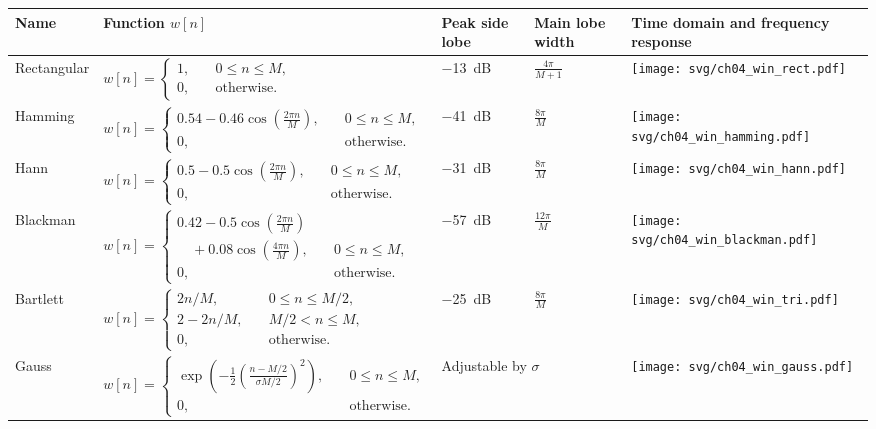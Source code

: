 \begin{refsection}
\begin{landscape}
	\begin{longtable}[H]{|l|l|l|l|l|}
		\hline
		Name & Function $w[n]$ & Peak side lobe & Main lobe width & Time domain and frequency response \\
		\hline
		\hline
		Rectangular & $w[n] = \begin{cases}1, &\quad 0 \leq n \leq M,\\ 0, &\quad \text{otherwise}.\end{cases}$ & \SI{-13}{dB} & $\frac{4\pi}{M+1}$ & \texttt{[image: svg/ch04\_win\_rect.pdf]} \\
		\hline
		Hamming & $w[n] = \begin{cases}0.54 - 0.46 \cos\left(\frac{2 \pi n}{M}\right), &\quad 0 \leq n \leq M,\\ 0, &\quad \text{otherwise}.\end{cases}$ & \SI{-41}{dB} & $\frac{8\pi}{M}$ &  \texttt{[image: svg/ch04\_win\_hamming.pdf]} \\
		\hline
		Hann & $w[n] = \begin{cases}0.5 - 0.5 \cos\left(\frac{2 \pi n}{M}\right), &\quad 0 \leq n \leq M,\\ 0, &\quad \text{otherwise}.\end{cases}$ & \SI{-31}{dB} & $\frac{8\pi}{M}$ &  \texttt{[image: svg/ch04\_win\_hann.pdf]} \\
		\hline
		Blackman & $w[n] = \begin{cases}0.42 - 0.5 \cos\left(\frac{2 \pi n}{M}\right) & \\ \quad + 0.08 \cos\left(\frac{4 \pi n}{M}\right), &\quad 0 \leq n \leq M,\\ 0, &\quad \text{otherwise}.\end{cases}$ & \SI{-57}{dB} & $\frac{12\pi}{M}$ &  \texttt{[image: svg/ch04\_win\_blackman.pdf]} \\
		\hline
		Bartlett & $w[n] = \begin{cases}2n/M, &\quad 0 \leq n \leq M/2,\\ 2 - 2n/M, &\quad M/2 < n \leq M,\\ 0, &\quad \text{otherwise}.\end{cases}$ & \SI{-25}{dB} & $\frac{8\pi}{M}$ &  \texttt{[image: svg/ch04\_win\_tri.pdf]} \\
		\hline
		Gauss & $w[n] = \begin{cases}\exp\left(- \frac{1}{2} \left(\frac{n - M/2}{\sigma M / 2}\right)^2\right), &\quad 0 \leq n \leq M,\\ 0, &\quad \text{otherwise}.\end{cases}$ & \multicolumn{2}{l|}{Adjustable by $\sigma$} &  \texttt{[image: svg/ch04\_win\_gauss.pdf]} \\
		\hline
	\end{longtable}


\end{landscape}
\end{refsection}
